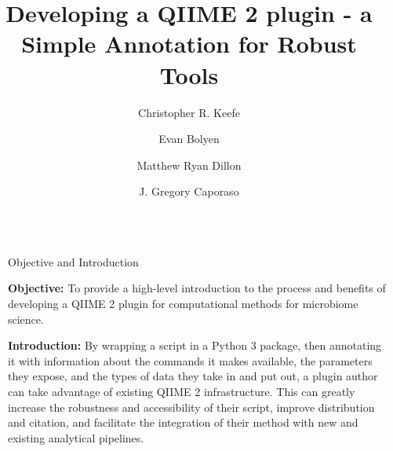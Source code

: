 \documentclass[final]{beamer}
\title{Developing a QIIME 2 plugin - a Simple Annotation for Robust Tools}
\author{Christopher R. Keefe \and Evan Bolyen \and Matthew Ryan Dillon \and J. Gregory Caporaso}
\institute[shortinst]{The Center for Applied Microbiome Science, Pathogen and Microbiome Institute, Northern Arizona University}
\newlength{\sepwidth}
\newlength{\colwidth}
\newcommand{\separatorcolumn}{\begin{column}{\sepwidth}\end{column}}
\begin{document}
\begin{frame}[t]
\begin{columns}[t]
\separatorcolumn

\begin{column}{\colwidth}

  \begin{block}{Objective and Introduction}

    \textbf{Objective:} To provide a high-level introduction to the process and
     benefits of developing a  QIIME 2 \cite{10.7287/peerj.preprints.27295v1}
     plugin for computational methods for microbiome science.
    \hfill\break

    \textbf{Introduction:} By wrapping a script in a Python 3 package, then
    annotating it with information about the commands it makes available, the
    parameters they expose, and the types of data they take in and put out, a
    plugin author can take advantage of existing QIIME 2 infrastructure. This
    can greatly increase the robustness and accessibility of their script,
    improve distribution and citation, and facilitate the integration of
    their method with new and existing analytical pipelines.
    \hfill\break


\end{block}
\end{column}
\end{columns}
\end{frame}
\end{document}
